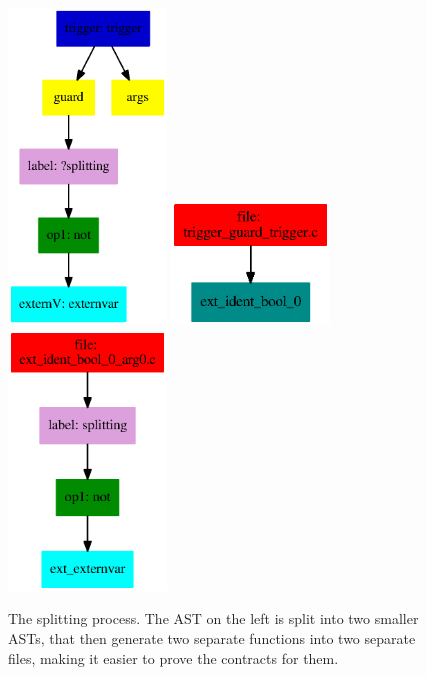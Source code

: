 \begin{figure}[!htb]
	\vspace*{2cm}
	\includegraphics[width=42mm]{images/label/main.ps}
	\includegraphics[width=42mm]{images/label/splitted.ps}
	\includegraphics[width=42mm]{images/label/splitted2.ps}
	\caption{The splitting process. The AST on the left is split into two smaller ASTs, that then generate two separate functions into two separate files, making it easier to prove the contracts for them.}
	\label{fig:splitting label}
\end{figure}
